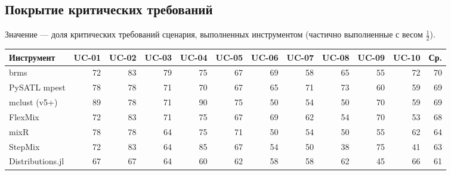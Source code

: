 \documentclass[10pt,a4paper]{article}
\begin{document}
\subsection{Покрытие критических требований}
Значение --- доля критических требований сценария, выполненных инструментом (частично выполненные с весом $\tfrac12$).
{\scriptsize\setlength{\tabcolsep}{3pt}
\begin{longtable}{@{}l *{11}{r}@{}}
\toprule
Инструмент & UC-01 & UC-02 & UC-03 & UC-04 & UC-05 & UC-06 & UC-07 & UC-08 & UC-09 & UC-10 & Ср. \\
\midrule
\endhead
brms & \cellcolor{hm!56}72 & \cellcolor{hm!63}83 & \cellcolor{hm!60}79 & \cellcolor{hm!58}75 & \cellcolor{hm!52}67 & \cellcolor{hm!53}69 & \cellcolor{hm!46}58 & \cellcolor{hm!51}65 & \cellcolor{hm!44}55 & \cellcolor{hm!55}72 & \cellcolor{hm!54}70 \\
PySATL mpest & \cellcolor{hm!59}78 & \cellcolor{hm!59}78 & \cellcolor{hm!55}71 & \cellcolor{hm!54}70 & \cellcolor{hm!52}67 & \cellcolor{hm!51}65 & \cellcolor{hm!55}71 & \cellcolor{hm!56}73 & \cellcolor{hm!47}60 & \cellcolor{hm!47}59 & \cellcolor{hm!53}69 \\
mclust (v5+) & \cellcolor{hm!67}89 & \cellcolor{hm!59}78 & \cellcolor{hm!55}71 & \cellcolor{hm!68}90 & \cellcolor{hm!58}75 & \cellcolor{hm!40}50 & \cellcolor{hm!43}54 & \cellcolor{hm!40}50 & \cellcolor{hm!54}70 & \cellcolor{hm!47}59 & \cellcolor{hm!53}69 \\
FlexMix & \cellcolor{hm!56}72 & \cellcolor{hm!63}83 & \cellcolor{hm!55}71 & \cellcolor{hm!58}75 & \cellcolor{hm!52}67 & \cellcolor{hm!53}69 & \cellcolor{hm!49}62 & \cellcolor{hm!43}54 & \cellcolor{hm!54}70 & \cellcolor{hm!42}53 & \cellcolor{hm!52}68 \\
mixR & \cellcolor{hm!59}78 & \cellcolor{hm!59}78 & \cellcolor{hm!50}64 & \cellcolor{hm!58}75 & \cellcolor{hm!55}71 & \cellcolor{hm!40}50 & \cellcolor{hm!43}54 & \cellcolor{hm!40}50 & \cellcolor{hm!44}55 & \cellcolor{hm!49}62 & \cellcolor{hm!50}64 \\
StepMix & \cellcolor{hm!56}72 & \cellcolor{hm!63}83 & \cellcolor{hm!50}64 & \cellcolor{hm!64}85 & \cellcolor{hm!52}67 & \cellcolor{hm!43}54 & \cellcolor{hm!40}50 & \cellcolor{hm!32}38 & \cellcolor{hm!58}75 & \cellcolor{hm!33}41 & \cellcolor{hm!49}63 \\
Distributions.jl & \cellcolor{hm!52}67 & \cellcolor{hm!52}67 & \cellcolor{hm!50}64 & \cellcolor{hm!47}60 & \cellcolor{hm!49}62 & \cellcolor{hm!45}58 & \cellcolor{hm!46}58 & \cellcolor{hm!48}62 & \cellcolor{hm!36}45 & \cellcolor{hm!51}66 & \cellcolor{hm!48}61 \\

\end{longtable}}
\end{document}
